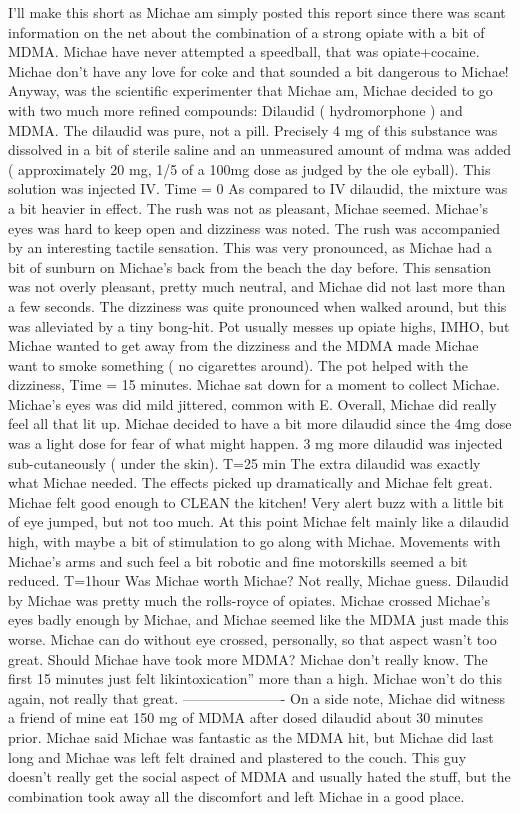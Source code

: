 \documentclass[12pt]{book}
\begin{document}
I'll make this short as Michae am simply posted this report since there was scant information on the net about the combination of a strong opiate with a bit of MDMA. Michae have never attempted a speedball, that was opiate+cocaine. Michae don't have any love for coke and that sounded a bit dangerous to Michae! Anyway, was the scientific experimenter that Michae am, Michae decided to go with two much more refined compounds: Dilaudid ( hydromorphone ) and MDMA. The dilaudid was pure, not a pill. Precisely 4 mg of this substance was dissolved in a bit of sterile saline and an unmeasured amount of mdma was added ( approximately 20 mg, 1/5 of a 100mg dose as judged by the ole eyball). This solution was injected IV. Time = 0 As compared to IV dilaudid, the mixture was a bit heavier in effect. The rush was not as pleasant, Michae seemed. Michae's eyes was hard to keep open and dizziness was noted. The rush was accompanied by an interesting tactile sensation. This was very pronounced, as Michae had a bit of sunburn on Michae's back from the beach the day before. This sensation was not overly pleasant, pretty much neutral, and Michae did not last more than a few seconds. The dizziness was quite pronounced when walked around, but this was alleviated by a tiny bong-hit. Pot usually messes up opiate highs, IMHO, but Michae wanted to get away from the dizziness and the MDMA made Michae want to smoke something ( no cigarettes around). The pot helped with the dizziness, Time = 15 minutes. Michae sat down for a moment to collect Michae. Michae's eyes was did mild jittered, common with E. Overall, Michae did really feel all that lit up. Michae decided to have a bit more dilaudid since the 4mg dose was a light dose for fear of what might happen. 3 mg more dilaudid was injected sub-cutaneously ( under the skin). T=25 min The extra dilaudid was exactly what Michae needed. The effects picked up dramatically and Michae felt great. Michae felt good enough to CLEAN the kitchen! Very alert buzz with a little bit of eye jumped, but not too much. At this point Michae felt mainly like a dilaudid high, with maybe a bit of stimulation to go along with Michae. Movements with Michae's arms and such feel a bit robotic and fine motorskills seemed a bit reduced. T=1hour Was Michae worth Michae? Not really, Michae guess. Dilaudid by Michae was pretty much the rolls-royce of opiates. Michae crossed Michae's eyes badly enough by Michae, and Michae seemed like the MDMA just made this worse. Michae can do without eye crossed, personally, so that aspect wasn't too great. Should Michae have took more MDMA? Michae don't really know. The first 15 minutes just felt likintoxication'' more than a high. Michae won't do this again, not really that great. ---------------------- On a side note, Michae did witness a friend of mine eat 150 mg of MDMA after dosed dilaudid about 30 minutes prior. Michae said Michae was fantastic as the MDMA hit, but Michae did last long and Michae was left felt drained and plastered to the couch. This guy doesn't really get the social aspect of MDMA and usually hated the stuff, but the combination took away all the discomfort and left Michae in a good place.
\end{document}
